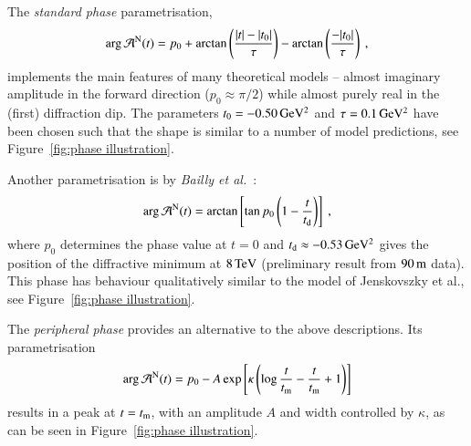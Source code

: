 The {\it standard phase} parametrisation,
\begin{equation}
\label{eqn:nuc phase std}
\arg {\cal A}^{\rm N}(t) = p_{0} + \arctan \left(\frac{|t|-|t_{0}|}{\tau}\right) -  \arctan \left(\frac{-|t_{0}|}{\tau}\right) \: ,
\end{equation}
implements the main features of many theoretical models -- almost imaginary amplitude in the forward direction ($p_0 \approx \pi/2$) while almost purely real in the (first) diffraction dip. The parameters $t_0 = - 0.50\,{\rm GeV^2}$ and $\tau = 0.1\,{\rm GeV^2}$ have been chosen such that the shape is similar to a number of model predictions, see Figure~\ref{fig:phase illustration}.

Another parametrisation is by {\em Bailly et al.}~\cite{bailly87}:
\begin{equation}
\label{eq:nuc phase bai}
	\arg {\cal A}^{\rm N}(t) = \arctan \left[ \tan p_0 \left(1 - {t\over t_{\rm d}} \right) \right]\ ,
\end{equation}
where $p_0$ determines the phase value at $t=0$ and $t_{\rm d} \approx -0.53\,{\rm GeV^2}$ gives the position of the diffractive minimum at $8\,{\rm TeV}$ (preliminary result from $90\,{\rm m}$ data). This phase has behaviour qualitatively similar to the model of Jenskovszky et al., see Figure~\ref{fig:phase illustration}.

The {\it peripheral phase} \cite{kl94} provides an alternative to the above descriptions. Its parametrisation
\begin{equation}
\label{eq:nuc phase per}
\arg {\cal A}^{\rm N}(t) = p_0 - A \exp\left[ \kappa \left( \log {t\over t_{\rm m}} - {t\over t_{\rm m}} + 1 \right) \right]
\end{equation}
results in a peak at $t = t_{\rm m}$, with an amplitude $A$ and width controlled by $\kappa$, as can be seen in Figure~\ref{fig:phase illustration}.

